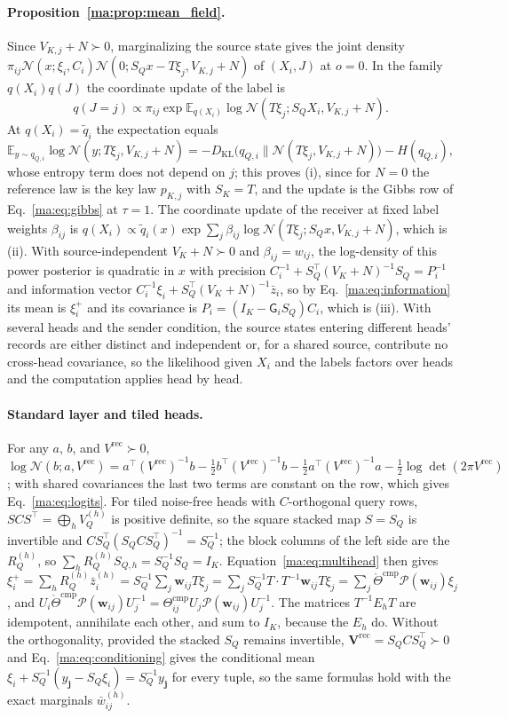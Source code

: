 \documentclass[11pt]{article}
\theoremstyle{definition}
\theoremstyle{remark}
\providecommand{\KL}{D_{\mathrm{KL}}}
\newcommand{\E}{\mathbb E}
\newcommand{\Gauss}{\mathcal N}
\newcommand{\Vrec}{V^{\mathrm{rec}}}
\newcommand{\Vrecb}{\mathbf V^{\mathrm{rec}}}
\newcommand{\G}{\mathsf G}
\newcommand{\Thr}{\mathring\Theta^{\mathrm{cmp}}}
\newcommand{\Thcmp}{\Theta^{\mathrm{cmp}}}
\newcommand{\qt}{\widetilde q}
\begin{document}
\paragraph{Proposition~\ref{ma:prop:mean_field}.}
Since $V_{K,j}+N\succ0$, marginalizing the source state gives the joint density $\pi_{ij}\Gauss(x;\xi_i,C_i)\Gauss(0;S_Qx-T\xi_j,V_{K,j}+N)$ of $(X_i,J)$ at $o=0$. In the family $q(X_i)q(J)$ the coordinate update of the label is \citep[Sec.~10.1.1]{Bishop2006}
\[
q(J=j)\propto\pi_{ij}\exp\E_{q(X_i)}\log\Gauss(T\xi_j;S_QX_i,V_{K,j}+N).
\]
At $q(X_i)=\qt_i$ the expectation equals
\[
\E_{y\sim q_{Q,i}}\log\Gauss(y;T\xi_j,V_{K,j}+N)=-\KL\bigl(q_{Q,i}\big\|\Gauss(T\xi_j,V_{K,j}+N)\bigr)-H(q_{Q,i}),
\]
whose entropy term does not depend on $j$; this proves (i), since for $N=0$ the reference law is the key law $p_{K,j}$ with $S_K=T$, and the update is the Gibbs row of Eq.~\eqref{ma:eq:gibbs} at $\tau=1$. The coordinate update of the receiver at fixed label weights $\beta_{ij}$ is $q(X_i)\propto\qt_i(x)\exp\sum_j\beta_{ij}\log\Gauss(T\xi_j;S_Qx,V_{K,j}+N)$, which is (ii). With source-independent $V_K+N\succ0$ and $\beta_{ij}=w_{ij}$, the log-density of this power posterior is quadratic in $x$ with precision $C_i^{-1}+S_Q^\top(V_K+N)^{-1}S_Q=P_i^{-1}$ and information vector $C_i^{-1}\xi_i+S_Q^\top(V_K+N)^{-1}\bar z_i$, so by Eq.~\eqref{ma:eq:information} its mean is $\xi_i^+$ and its covariance is $P_i=(I_K-\G_iS_Q)C_i$, which is (iii). With several heads and the sender condition, the source states entering different heads' records are either distinct and independent or, for a shared source, contribute no cross-head covariance, so the likelihood given $X_i$ and the labels factors over heads and the computation applies head by head.

\paragraph{Standard layer and tiled heads.}
For any $a$, $b$, and $\Vrec\succ0$, $\log\Gauss(b;a,\Vrec)=a^\top(\Vrec)^{-1}b-\frac12b^\top(\Vrec)^{-1}b-\frac12a^\top(\Vrec)^{-1}a-\frac12\log\det(2\pi\Vrec)$; with shared covariances the last two terms are constant on the row, which gives Eq.~\eqref{ma:eq:logits}. For tiled noise-free heads with $C$-orthogonal query rows, $SCS^\top=\bigoplus_hV^{(h)}_Q$ is positive definite, so the square stacked map $S=S_Q$ is invertible and $CS_Q^\top(S_QCS_Q^\top)^{-1}=S_Q^{-1}$; the block columns of the left side are the $R^{(h)}_Q$, so $\sum_hR^{(h)}_QS_{Q,h}=S_Q^{-1}S_Q=I_K$. Equation~\eqref{ma:eq:multihead} then gives $\xi_i^+=\sum_hR^{(h)}_Q\bar z^{(h)}_i=S_Q^{-1}\sum_j\boldsymbol w_{ij}T\xi_j=\sum_jS_Q^{-1}T\cdot T^{-1}\boldsymbol w_{ij}T\xi_j=\sum_j\Thr\mathcal P(\boldsymbol w_{ij})\xi_j$, and $U_i\Thr\mathcal P(\boldsymbol w_{ij})U_j^{-1}=\Thcmp_{ij}U_j\mathcal P(\boldsymbol w_{ij})U_j^{-1}$. The matrices $T^{-1}E_hT$ are idempotent, annihilate each other, and sum to $I_K$, because the $E_h$ do. Without the orthogonality, provided the stacked $S_Q$ remains invertible, $\Vrecb=S_QCS_Q^\top\succ0$ and Eq.~\eqref{ma:eq:conditioning} gives the conditional mean $\xi_i+S_Q^{-1}(y_{\mathbf j}-S_Q\xi_i)=S_Q^{-1}y_{\mathbf j}$ for every tuple, so the same formulas hold with the exact marginals $\bar w^{(h)}_{ij}$.
\end{document}
